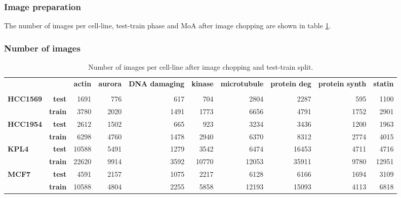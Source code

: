 \documentclass[a4paper,11pt,twoside,openright]{scrbook}
\begin{document}
\subsubsection{Image preparation}

The number of images per cell-line, test-train phase and MoA after image chopping are shown in table \ref{table:chopped_image_count}.

\subsubsection{Number of images}
\begin{table}[h]
    \scriptsize
    \captionsetup{width=0.8\textwidth}
    \caption[Number of chopped images for MoA prediction]{Number of images per cell-line after image chopping and test-train split.}
    \label{table:chopped_image_count}
\begin{tabular}{lrrrrrrrrr}
\toprule
        &  &  \textbf{actin} & \textbf{aurora} & \textbf{DNA damaging} & \textbf{kinase} & \textbf{microtubule} & \textbf{protein deg} & \textbf{protein synth} & \textbf{statin} \\
&  &        &        &              &        &             &             &               &        \\
\midrule
\textbf{HCC1569} & \textbf{test} &   1691 &    776 &          617 &    704 &        2804 &        2287 &           595 &   1100 \\
        & \textbf{train} &   3780 &   2020 &         1491 &   1773 &        6656 &        4791 &          1752 &   2901 \\
\textbf{HCC1954} & \textbf{test} &   2612 &   1502 &          665 &    923 &        3234 &        3436 &          1200 &   1963 \\
        & \textbf{train} &   6298 &   4760 &         1478 &   2940 &        6370 &        8312 &          2774 &   4015 \\
\textbf{KPL4} & \textbf{test} &  10588 &   5491 &         1279 &   3542 &        6474 &       16453 &          4711 &   4716 \\
        & \textbf{train} &  22620 &   9914 &         3592 &  10770 &       12053 &       35911 &          9780 &  12951 \\
\textbf{MCF7} & \textbf{test} &   4591 &   2157 &         1075 &   2217 &        6128 &        6166 &          1694 &   3109 \\
        & \textbf{train} &  10588 &   4804 &         2255 &   5858 &       12193 &       15093 &          4113 &   6818 \\

\end{tabular}
\end{table}
\end{document}
